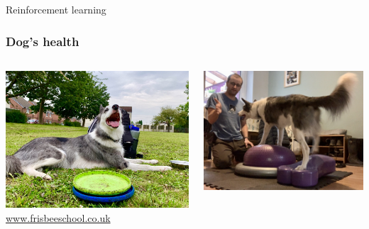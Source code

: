 \documentclass{beamer}
\begin{document}
    \begin{frame}
        \centering
        \Huge
        Reinforcement learning
    \end{frame}

    \begin{frame}
        \frametitle{Dog's health}
        \begin{columns}
            \begin{column}{.5\textwidth}
                \centering
                \includegraphics[width=\textwidth]{static/frisbees.jpg}
                \small
                \url{www.frisbeeschool.co.uk}
            \end{column}
            \begin{column}{.5\textwidth}
                \centering
                \includegraphics[width=\textwidth]{static/proprioception.jpg}
            \end{column}
        \end{columns}
    \end{frame}
\end{document}

